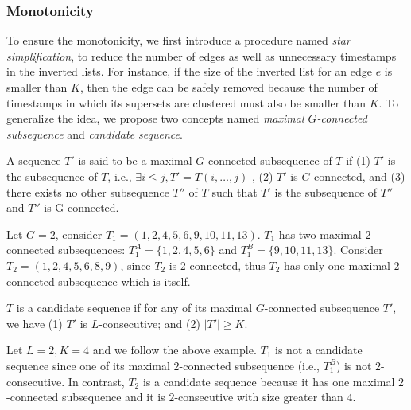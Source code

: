\subsubsection{Monotonicity}
To ensure the monotonicity, we first introduce a procedure named \textit{star simplification}, to reduce the number of edges as well as unnecessary timestamps in the inverted lists. For instance, if the size of the inverted list for an edge $e$ is smaller than $K$, then the edge can be safely removed because the number of timestamps in which its supersets are clustered must also be smaller than $K$. To generalize the idea, we propose two concepts named \textit{maximal $G$-connected subsequence} and \emph{candidate sequence}.

\begin{definition}
A sequence $T'$ is said to be a maximal $G$-connected subsequence of $T$ if (1) $T'$ is the subsequence of $T$, i.e., $\exists i\leq j, T' = T(i,\ldots,j)$ , (2) $T'$ is $G$-connected, and (3) there exists no other subsequence $T''$ of $T$ such that $T'$ is the subsequence of $T''$ and $T''$ is G-connected.
\end{definition}

\begin{example}
Let $G=2$, consider $T_1=(1,2,4,5,6,9,10,11,13)$. $T_1$ has two maximal $2$-connected subsequences:
$T_1^A=\{1,2,4,5,6\}$ and $T_1^B=\{9,10,11,13\}$. Consider $T_2=(1,2,4,5,6,8,9)$,
since $T_2$ is $2$-connected, thus $T_2$ has only one maximal $2$-connected subsequence which is
itself.
\end{example}


\begin{definition}
$T$ is a candidate sequence if for any of its maximal $G$-connected subsequence $T'$, we have (1) $T'$ is $L$-consecutive; and (2) $|T'|\geq K$.
\end{definition}

\begin{example}
Let $L = 2, K = 4$ and we follow the above example. $T_1$ is not a candidate sequence
since one of its maximal $2$-connected subsequence (i.e., $T_1^B$) is not $2$-consecutive.
In contrast, $T_2$ is a candidate sequence because it has one maximal $2$-connected subsequence
and it is $2$-consecutive with size greater than $4$.
\end{example}

